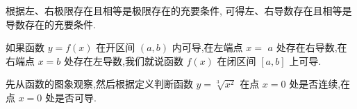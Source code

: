\documentclass[lang=cn,newtx,12pt,scheme=chinese]{elegantbook}
\begin{document}
根据左、右极限存在且相等是极限存在的充要条件, 可得左、右导数存在且相等是导数存在的充要条件.

\begin{property}
如果函数 \(y = f\left( x\right)\) 在开区间 \(\left( {a,b}\right)\) 内可导,在左端点 \(x =\) \(a\) 处存在右导数,在右端点 \(x = b\) 处存在左导数,我们就说函数 \(f\left( x\right)\) 在闭区间 \(\left\lbrack {a,b}\right\rbrack\) 上可导.
\end{property}

\begin{problemset}[练习]

\item 先从函数的图象观察,然后根据定义判断函数 \(y = \sqrt[3]{{x}^{2}}\) 在点 \(x = 0\) 处是否连续,在点 \(x = 0\) 处是否可导.

\end{problemset}
\end{document}
